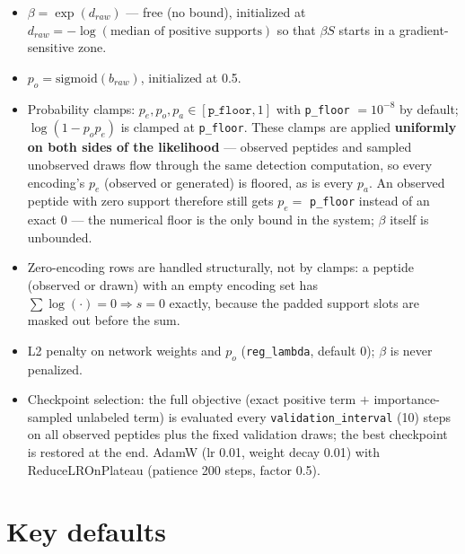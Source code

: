 \documentclass[11pt]{article}
\begin{document}
\begin{itemize}
\item $\beta = \exp(d_{raw})$ --- free (no bound), initialized at
$d_{raw} = -\log(\text{median of positive supports})$ so that $\beta S$
starts in a gradient-sensitive zone.
\item $p_o = \text{sigmoid}(b_{raw})$, initialized at 0.5.
\item Probability clamps: $p_e, p_o, p_a \in [\texttt{p\_floor}, 1]$
with \texttt{p\_floor} $= 10^{-8}$ by default; $\log(1 - p_o p_e)$ is
clamped at \texttt{p\_floor}. These clamps are applied
\textbf{uniformly on both sides of the likelihood} --- observed peptides
and sampled unobserved draws flow through the same detection
computation, so every encoding's $p_e$ (observed or generated) is
floored, as is every $p_a$. An observed peptide with zero support
therefore still gets $p_e =$ \texttt{p\_floor} instead of an exact 0 ---
the numerical floor is the only bound in the system; $\beta$ itself is
unbounded.
\item Zero-encoding rows are handled structurally, not by clamps: a
peptide (observed or drawn) with an empty encoding set has
$\sum \log(\cdot) = 0 \Rightarrow s = 0$ exactly, because the padded
support slots are masked out before the sum.
\item L2 penalty on network weights and $p_o$ (\texttt{reg\_lambda},
default 0); $\beta$ is never penalized.
\item Checkpoint selection: the full objective (exact positive term $+$
importance-sampled unlabeled term) is evaluated every
\texttt{validation\_interval} (10) steps on all observed peptides plus
the fixed validation draws; the best checkpoint is restored at the end.
AdamW (lr 0.01, weight decay 0.01) with ReduceLROnPlateau (patience 200
steps, factor 0.5).
\end{itemize}

\section{Key defaults}\label{sec:defaults}
\end{document}
